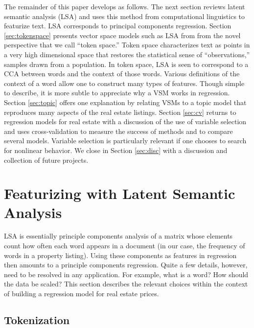 \documentclass[12pt]{article}
\begin{document}
 The remainder of this paper develops as follows.  The next section reviews
 latent semantic analysis (LSA) and uses this method from
 computational linguistics to featurize text.  LSA corresponds to
 principal components regression.  Section \ref{sec:tokenspace} presents vector
 space models such as LSA from from the novel perspective that we call ``token
 space.'' Token space characterizes text as points in a very high dimensional
 space that restores the statistical sense of ``observations,'' samples drawn
 from a population.  In token space, LSA is seen to correspond to a CCA between
 words and the context of those words.  Various definitions of the context of a
 word allow one to construct many types of features.  Though 
 simple to describe, it is more subtle to appreciate why a VSM works in
 regression.  Section \ref{sec:topic} offers one explanation by relating VSMs to
 a topic model that reproduces many aspects of the real estate listings.
  Section \ref{sec:cv} returns to regression models for real estate with a
 discussion of the use of variable selection and uses cross-validation to
 measure the success of methods and to compare several models.  Variable
 selection is particularly relevant if one chooses to search for nonlinear
 behavior.  We close in Section \ref{sec:disc} with a discussion and collection
 of future projects.



\section{Featurizing with Latent Semantic Analysis}
\label{sec:lsa}

 LSA is essentially principle components analysis
 of a matrix whose elements count how often each word appears in a document (in our
 case, the frequency of words in a property listing).  Using these components as
 features in regression then amounts to a principle components regression.
  Quite a few details, however, need to be resolved in any application. For
 example, what is a word?  How should the data be scaled? 
 This section describes the relevant choices within
 the context of building a regression model for real estate prices.
 
 \subsection{ Tokenization }  %
\end{document}
